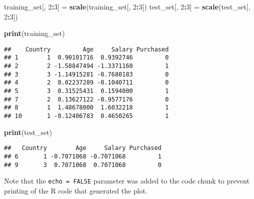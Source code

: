 \documentclass[
]{article}
\newenvironment{Shaded}{\begin{snugshade}}{\end{snugshade}}
\newcommand{\DecValTok}[1]{\textcolor[rgb]{0.00,0.00,0.81}{#1}}
\newcommand{\FunctionTok}[1]{\textcolor[rgb]{0.13,0.29,0.53}{\textbf{#1}}}
\newcommand{\NormalTok}[1]{#1}
\newcommand{\OtherTok}[1]{\textcolor[rgb]{0.56,0.35,0.01}{#1}}
\newcommand{\SpecialCharTok}[1]{\textcolor[rgb]{0.81,0.36,0.00}{\textbf{#1}}}
\begin{document}
\begin{Shaded}
\begin{Highlighting}[]
\NormalTok{training\_set[, }\DecValTok{2}\SpecialCharTok{:}\DecValTok{3}\NormalTok{] }\OtherTok{=} \FunctionTok{scale}\NormalTok{(training\_set[, }\DecValTok{2}\SpecialCharTok{:}\DecValTok{3}\NormalTok{])}
\NormalTok{test\_set[, }\DecValTok{2}\SpecialCharTok{:}\DecValTok{3}\NormalTok{] }\OtherTok{=} \FunctionTok{scale}\NormalTok{(test\_set[, }\DecValTok{2}\SpecialCharTok{:}\DecValTok{3}\NormalTok{])}

\FunctionTok{print}\NormalTok{(training\_set)}
\end{Highlighting}
\end{Shaded}

\begin{verbatim}
##    Country         Age     Salary Purchased
## 1        1  0.90101716  0.9392746         0
## 2        2 -1.58847494 -1.3371160         1
## 3        3 -1.14915281 -0.7680183         0
## 4        2  0.02237289 -0.1040711         0
## 5        3  0.31525431  0.1594000         1
## 7        2  0.13627122 -0.9577176         0
## 8        1  1.48678000  1.6032218         1
## 10       1 -0.12406783  0.4650265         1
\end{verbatim}

\begin{Shaded}
\begin{Highlighting}[]
\FunctionTok{print}\NormalTok{(test\_set)}
\end{Highlighting}
\end{Shaded}

\begin{verbatim}
##   Country        Age     Salary Purchased
## 6       1 -0.7071068 -0.7071068         1
## 9       3  0.7071068  0.7071068         0
\end{verbatim}

Note that the \texttt{echo\ =\ FALSE} parameter was added to the code
chunk to prevent printing of the R code that generated the plot.
\end{document}
